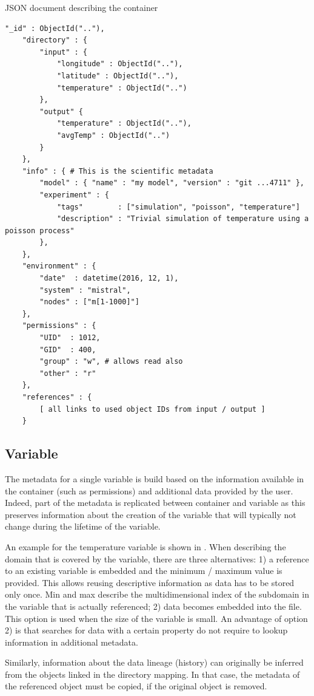\begin{tcbcode}[label={lst:mongoContainer}]{JSON document describing the container}
	\begin{lstlisting}[upquote=true]
	"_id" : ObjectId(".."),
	"directory" : {
		"input" : {
			"longitude" : ObjectId(".."),
			"latitude" : ObjectId(".."),
			"temperature" : ObjectId("..")
		},
		"output" {
			"temperature" : ObjectId(".."),
			"avgTemp" : ObjectId("..")
		}
	},
	"info" : { # This is the scientific metadata
		"model" : { "name" : "my model", "version" : "git ...4711" },
		"experiment" : {
			"tags"        : ["simulation", "poisson", "temperature"]
			"description" : "Trivial simulation of temperature using a poisson process"
		},
	},
	"environment" : {
		"date"  : datetime(2016, 12, 1),
		"system" : "mistral",
		"nodes" : ["m[1-1000]"]
	},
	"permissions" : {
		"UID"  : 1012,
		"GID"  : 400,
		"group" : "w", # allows read also
		"other" : "r"
	},
	"references" : {
		[ all links to used object IDs from input / output ]
	}
	\end{lstlisting}
\end{tcbcode}

\subsection{Variable}

The metadata for a single variable is build based on the information available in the container (such as permissions) and additional data provided by the user.
Indeed, part of the metadata is replicated between container and variable as this preserves information about the creation of the variable that will typically not change during the lifetime of the variable.

An example for the temperature variable is shown in .
When describing the domain that is covered by the variable, there are three alternatives:
1) a reference to an existing variable is embedded and the minimum / maximum value is provided.
This allows reusing descriptive information as data has to be stored only once. Min and max describe the multidimensional index of the subdomain in the variable that is actually referenced;
2) data becomes embedded into the file. This option is used when the size of the variable is small.
An advantage of option 2) is that searches for data with a certain property do not require to lookup information in additional metadata.

Similarly, information about the data lineage (history) can originally be inferred from the objects linked in the directory mapping.
In that case, the metadata of the referenced object must be copied, if the original object is removed.

